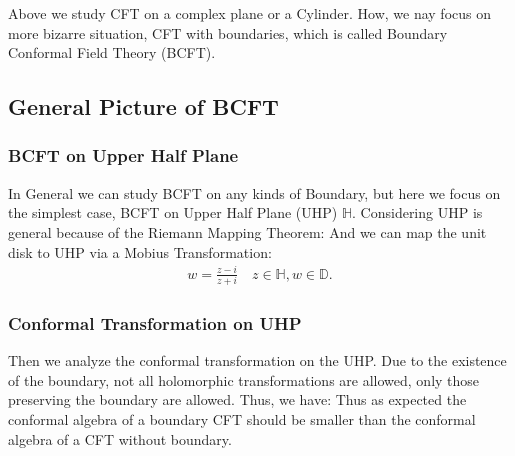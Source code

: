 Above we study CFT on a complex plane or a Cylinder. How, we nay focus on more bizarre situation, CFT with boundaries, which is called Boundary Conformal Field Theory (BCFT). 

\subsection{General Picture of BCFT}



\subsubsection{BCFT on Upper Half Plane}

In General we can study BCFT on any kinds of Boundary, but here we focus on the simplest case, BCFT on Upper Half Plane (UHP) $ \mathbb{H} $. Considering UHP is general because of the Riemann Mapping Theorem:
And we can map the unit disk to UHP via a Mobius Transformation:
\begin{align}
  w=\frac{z-i}{z+i} \quad z \in \mathbb{H} ,  w \in \mathbb{D}.
\end{align}


\subsubsection{Conformal Transformation on UHP}

Then we analyze the conformal transformation on the UHP. Due to the existence of the boundary, not all holomorphic transformations are allowed, only those preserving the boundary are allowed. Thus, we have:
Thus as expected the conformal algebra of a boundary CFT should be smaller than the conformal algebra of a CFT without boundary. 

